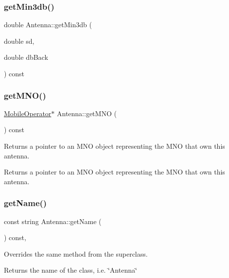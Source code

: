 \subsubsection{\texorpdfstring{get\+Min3db()}{getMin3db()}}
{\footnotesize\ttfamily double Antenna\+::get\+Min3db (\begin{DoxyParamCaption}\item[{double}]{sd,  }\item[{double}]{db\+Back }\end{DoxyParamCaption}) const\hspace{0.3cm}{\ttfamily [private]}}

\mbox{\label{class_antenna_abfbb4a654f73fe0c3a30f50777f79349}} 
\subsubsection{\texorpdfstring{get\+M\+N\+O()}{getMNO()}}
{\footnotesize\ttfamily \hyperlink{class_mobile_operator}{Mobile\+Operator}$\ast$ Antenna\+::get\+M\+NO (\begin{DoxyParamCaption}{ }\end{DoxyParamCaption}) const}

Returns a pointer to an M\+NO object representing the M\+NO that own this antenna. \begin{DoxyReturn}{Returns}
a pointer to an M\+NO object representing the M\+NO that own this antenna. 
\end{DoxyReturn}
\mbox{\label{class_antenna_a4ad9da1ca9d79f20b331c22b94c57a02}} 
\subsubsection{\texorpdfstring{get\+Name()}{getName()}}
{\footnotesize\ttfamily const string Antenna\+::get\+Name (\begin{DoxyParamCaption}{ }\end{DoxyParamCaption}) const\hspace{0.3cm}{\ttfamily [override]}, {\ttfamily [virtual]}}

Overrides the same method from the superclass. \begin{DoxyReturn}{Returns}
the name of the class, i.\+e. \char`\"{}\+Antenna\char`\"{} 
\end{DoxyReturn}


